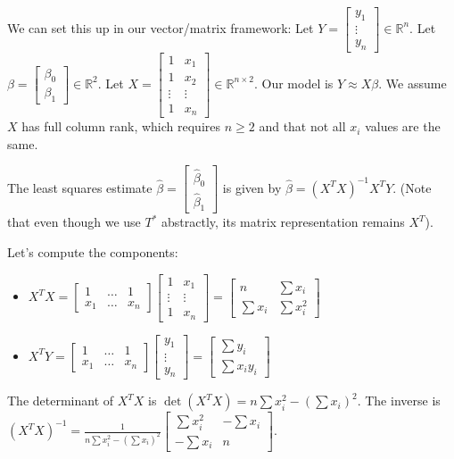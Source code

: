 \documentclass[11pt]{article}
\theoremstyle{definition}
\theoremstyle{remark}
\newcommand{\R}{\mathbb{R}} %
\begin{document}
We can set this up in our vector/matrix framework:
Let $Y = \begin{bmatrix} y_1 \\ \vdots \\ y_n \end{bmatrix} \in \R^n$.
Let $\beta = \begin{bmatrix} \beta_0 \\ \beta_1 \end{bmatrix} \in \R^2$.
Let $X = \begin{bmatrix} 1 & x_1 \\ 1 & x_2 \\ \vdots & \vdots \\ 1 & x_n \end{bmatrix} \in \R^{n \times 2}$.
Our model is $Y \approx X\beta$. We assume $X$ has full column rank, which requires $n \ge 2$ and that not all $x_i$ values are the same.

The least squares estimate $\hat{\beta} = \begin{bmatrix} \hat{\beta}_0 \\ \hat{\beta}_1 \end{bmatrix}$ is given by $\hat{\beta} = (X^T X)^{-1} X^T Y$. (Note that even though we use $T^*$ abstractly, its matrix representation remains $X^T$).

Let's compute the components:
\begin{itemize}
    \item $X^T X = \begin{bmatrix} 1 & \dots & 1 \\ x_1 & \dots & x_n \end{bmatrix} \begin{bmatrix} 1 & x_1 \\ \vdots & \vdots \\ 1 & x_n \end{bmatrix} = \begin{bmatrix} n & \sum x_i \\ \sum x_i & \sum x_i^2 \end{bmatrix}$
    \item $X^T Y = \begin{bmatrix} 1 & \dots & 1 \\ x_1 & \dots & x_n \end{bmatrix} \begin{bmatrix} y_1 \\ \vdots \\ y_n \end{bmatrix} = \begin{bmatrix} \sum y_i \\ \sum x_i y_i \end{bmatrix}$
\end{itemize}
The determinant of $X^T X$ is $\det(X^T X) = n \sum x_i^2 - (\sum x_i)^2$.
The inverse is $(X^T X)^{-1} = \frac{1}{n \sum x_i^2 - (\sum x_i)^2} \begin{bmatrix} \sum x_i^2 & -\sum x_i \\ -\sum x_i & n \end{bmatrix}$.
\end{document}
